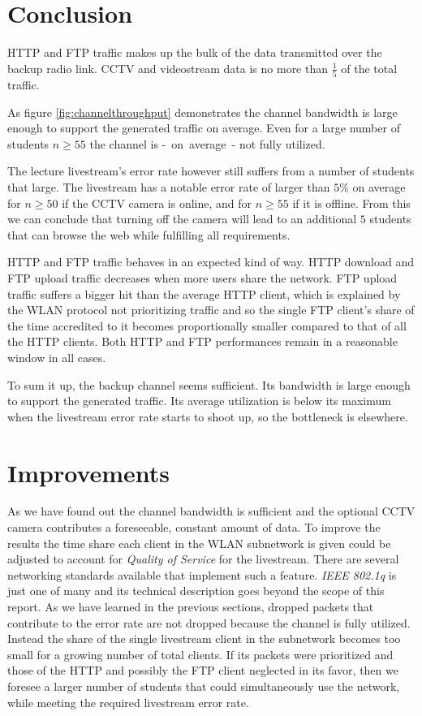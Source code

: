 \documentclass[a4paper]{scrreprt}
\begin{document}
		 \section{Conclusion}
		 	HTTP and FTP traffic makes up the bulk of the data transmitted over the backup radio link. CCTV and videostream data is no more than $\frac{1}{5}$ of the total traffic. 
		 	
		 	As figure \ref{fig:channelthroughput} demonstrates the channel bandwidth is large enough to support the generated traffic on average. Even for a large number of students $n\geq 55$ the channel is -~on~average~- not fully utilized. 
		 	
		 	The lecture livestream's error rate however still suffers from a number of students that large. The livestream has a notable error rate of larger than $5\%$ on average for $n\geq 50$ if the CCTV camera is online, and for $n\geq 55$ if it is offline. From this we can conclude that turning off the camera will lead to an additional $5$ students that can browse the web while fulfilling all requirements.
		 	
		 	HTTP and FTP traffic behaves in an expected kind of way. HTTP download and FTP upload traffic decreases when more users share the network. FTP upload traffic suffers a bigger hit than the average HTTP client, which is explained by the WLAN protocol not prioritizing traffic and so the single FTP client's share of the time accredited to it becomes proportionally smaller compared to that of all the HTTP clients. Both HTTP and FTP performances remain in a reasonable window in all cases.		 			 	
		 	
		 	To sum it up, the backup channel seems sufficient. Its bandwidth is large enough to support the generated traffic. Its average utilization is below its maximum when the livestream error rate starts to shoot up, so the bottleneck is elsewhere.
		 	
		 \section{Improvements}
		 	As we have found out the channel bandwidth is sufficient and the optional CCTV camera contributes a foreseeable, constant amount of data. To improve the results the time share each client in the WLAN subnetwork is given could be adjusted to account for \emph{Quality of Service} for the livestream. There are several networking standards available that implement such a feature. \emph{IEEE 802.1q} is just one of many and its technical description goes beyond the scope of this report. As we have learned in the previous sections, dropped packets that contribute to the error rate are not dropped because the channel is fully utilized. Instead the share of the single livestream client in the subnetwork becomes too small for a growing number of total clients. If its packets were prioritized and those of the HTTP and possibly the FTP client neglected in its favor, then we foresee a larger number of students that could simultaneously use the network, while meeting the required livestream error rate.
\end{document}
